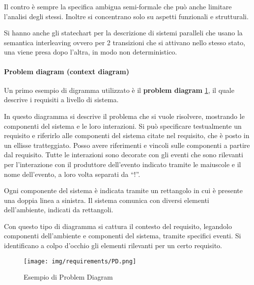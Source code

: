 Il contro è sempre la specifica ambigua semi-formale che può anche limitare l'analisi
degli stessi. Inoltre si concentrano solo su aspetti funzionali e strutturali.

Si hanno anche gli statechart per la descrizione di sistemi paralleli che usano
la semantica interleaving ovvero per 2 transizioni che si attivano nello stesso
stato, una viene presa dopo l'altra, in modo non deterministico.
\paragraph{Problem diagram (context diagram)}
Un primo esempio di digramma utilizzato è il \textbf{problem diagram}
\ref{fig:problemDiagram}, il quale
descrive i requisiti a livello di sistema.

In questo diagramma si descrive il problema che si vuole risolvere, mostrando le
componenti del sistema e le loro interazioni. Si può specificare testualmente un
requisito e riferirlo alle componenti del sistema citate nel requisito, che è
posto in un ellisse tratteggiato. Posso avere riferimenti e vincoli sulle
componenti a partire dal requisito. Tutte le interazioni sono decorate con gli
eventi che sono rilevanti per l'interazione con il produttore dell'evento indicato
tramite le maiuscole e il nome dell'evento, a loro volta separati da “!”.

Ogni componente del sistema è indicata tramite un rettangolo in cui è presente
una doppia linea a sinistra. Il sistema comunica con diversi elementi dell'ambiente,
indicati da rettangoli.

Con questo tipo di diagramma si cattura il contesto del requisito, legandolo
componenti dell'ambiente e componenti del sistema, tramite specifici eventi.
Si identificano a colpo d'occhio gli elementi rilevanti per un certo requisito.
\begin{figure}[!ht]
      \centering
      \texttt{[image: img/requirements/PD.png]}
      \caption{Esempio di Problem Diagram}
      \label{fig:problemDiagram}
\end{figure}

